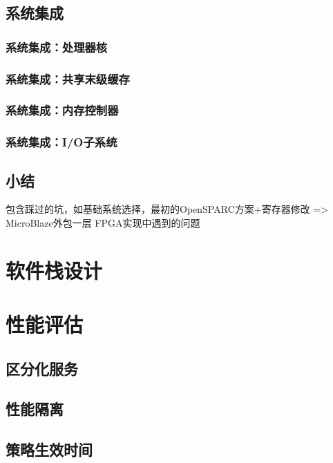 \subsection{系统集成}

\subsubsection*{系统集成：处理器核}

\subsubsection*{系统集成：共享末级缓存}

\subsubsection*{系统集成：内存控制器}

\subsubsection*{系统集成：I/O子系统}


\subsection{小结}
包含踩过的坑，如基础系统选择，最初的OpenSPARC方案+寄存器修改 => MicroBlaze外包一层
FPGA实现中遇到的问题


\section{软件栈设计}



\section{性能评估}

\subsection{区分化服务}

\subsection{性能隔离}

\subsection{策略生效时间}

